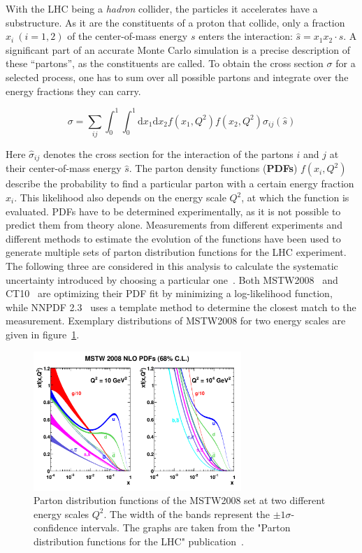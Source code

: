 With the LHC being a \textit{hadron} collider, the particles it accelerates have a substructure. As it are the constituents of a proton that collide, only a fraction $x_i \: (i = 1,2)$ of the center-of-mass energy $s$ enters the interaction: $\hat{s} = x_1 x_2 \cdot s$. A significant part of an accurate Monte Carlo simulation is a precise description of these ``partons'', as the constituents are called. To obtain the cross section $\sigma$ for a selected process, one has to sum over all possible partons and integrate over the energy fractions they can carry.

\begin{equation}
  \label{eq:pdfxs}
  \sigma = \sum_{ij} \int_0^1 \int_0^1 \text{d}x_1 \text{d}x_2 f(x_1, Q^2) f(x_2 ,Q^2) \hat{\sigma}_{ij}(\hat{s})
\end{equation}

Here $\hat{\sigma}_{ij}$ denotes the cross section for the interaction of the partons $i$ and $j$ at their center-of-mass energy $\hat{s}$. The parton density functions (\textbf{PDFs}) $f(x_i, Q^2)$ describe the probability to find a particular parton with a certain energy fraction $x_i$. This likelihood also depends on the energy scale $Q^2$, at which the function is evaluated. PDFs have to be determined experimentally, as it is not possible to predict them from theory alone. Measurements from different experiments and different methods to estimate the evolution of the functions have been used to generate multiple sets of parton distribution functions for the LHC experiment. The following three are considered in this analysis to calculate the systematic uncertainty introduced by choosing a particular one~\cite{pdfforlhc}. Both \textsc{MSTW2008}~\cite{mstw2008,mstw2008as} and \textsc{CT10}~\cite{ct10} are optimizing their PDF fit by minimizing a log-likelihood function, while \textsc{NNPDF 2.3}~\cite{nnpdf23,nnpdf23as} uses a template method to determine the closest match to the measurement. Exemplary distributions of \textsc{MSTW2008} for two energy scales are given in figure~\ref{fig:mstw2008pdf}.

\begin{figure}[htb!]
  \centering
  \includegraphics[width=0.7\textwidth]{plots/mstw2008pdf.pdf}
  \caption{Parton distribution functions of the MSTW2008 set at two different energy scales $Q^2$. The width of the bands represent the $\pm 1 \sigma$-confidence intervals. The graphs are taken from the "Parton distribution functions for the LHC" publication~\cite{pdfforlhc}.}
  \label{fig:mstw2008pdf}
\end{figure}

